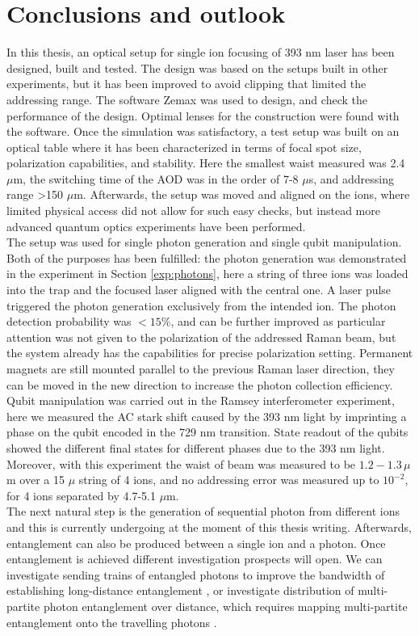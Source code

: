 
\chapter{Conclusions and outlook}
In this thesis, an optical setup for single ion focusing of 393 nm laser has been designed, built and tested. The design was based on the setups built in other experiments, but it has been improved to avoid clipping that limited the addressing range. The software Zemax was used to design, and check the performance of the design. Optimal lenses for the construction were found with the software. Once the simulation was satisfactory, a test setup was built on an optical table where it has been characterized in terms of focal spot size, polarization capabilities, and stability. Here the smallest waist measured was 2.4 $\mu$m, the switching time of the AOD was in the order of 7-8 $\mu$s, and addressing range >150 $\mu$m. Afterwards, the setup was moved and aligned on the ions, where limited physical access did not allow for such easy checks, but instead more advanced quantum optics experiments have been performed.\\
The setup was used for single photon generation and single qubit manipulation. Both of the purposes has been fulfilled: the photon generation was demonstrated in the experiment in Section \ref{exp:photons}, here a string of three ions was loaded into the trap and the focused laser aligned with the central one. A laser pulse triggered the photon generation exclusively from the intended ion. The photon detection probability was $<15\%$, and can be further improved as particular attention was not given to the polarization of the addressed Raman beam, but the system already has the capabilities for precise polarization setting. Permanent magnets are still mounted parallel to the previous Raman laser direction, they can be moved in the new direction to increase the photon collection efficiency.
 Qubit manipulation was carried out in the Ramsey interferometer experiment, here we measured the AC stark shift caused by the 393 nm light by imprinting a phase on the qubit encoded in the 729 nm transition. State readout of the qubits showed the different final states for different phases due to the 393 nm light. Moreover, with this experiment the waist of beam was measured to be $1.2-1.3\,\mu$m over a 15 $\mu$ string of 4 ions, and no addressing error was measured up to $10^{-2}$, for 4 ions separated by 4.7-5.1 $\mu$m.\\
The next natural step is the generation of sequential photon from different ions and this is currently undergoing at the moment of this thesis writing. Afterwards, entanglement can also be produced between a single ion and a photon. Once entanglement is achieved different investigation prospects will open. We can investigate sending trains of entangled photons to improve the bandwidth of establishing long-distance entanglement \cite{Krutyanskiy2019}, or investigate distribution of multi-partite photon entanglement over distance, which requires mapping multi-partite entanglement onto the travelling photons \cite{Arenskotter:19}.
